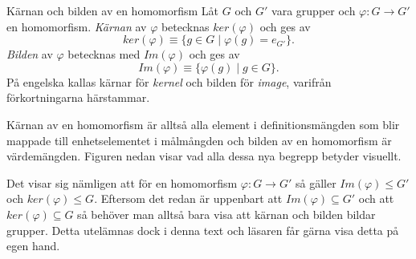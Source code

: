 \documentclass{article}
\theoremstyle{definition}
\begin{document}
\begin{mydef}{Kärnan och bilden av en homomorfism}{}
  Låt $G$ och $G'$ vara grupper och $\varphi : G \rightarrow G'$ en homomorfism.
  \textit{Kärnan} av $\varphi$ betecknas $ker(\varphi)$
  och ges av 
  \[ker(\varphi) \equiv \{g \in G \; | \; \varphi(g) = e_{G'}\}.\]
  \textit{Bilden} av $\varphi$ betecknas med $Im(\varphi)$ och ges av 
  \[Im(\varphi) \equiv \{\varphi(g) \; | \; g \in G\}.\]
  På engelska kallas kärnar för \textit{kernel} och bilden för \textit{image}, varifrån 
  förkortningarna härstammar.
\end{mydef}
Kärnan av en homomorfism är alltså alla element i definitionsmängden som blir mappade 
till enhetselementet i målmångden och bilden av en homomorfism är värdemängden. 
Figuren nedan visar vad alla dessa nya begrepp betyder visuellt.
\begin{center}
\end{center}

Det visar sig nämligen att för en homomorfism $\varphi : G \rightarrow G'$ så gäller
$Im(\varphi) \le G'$ och $ker(\varphi) \le G$. Eftersom det redan är uppenbart att
$Im(\varphi) \subseteq G'$
och att $ker(\varphi) \subseteq G$ så behöver man alltså bara visa att kärnan och bilden bildar 
grupper. Detta utelämnas dock i denna text och läsaren får gärna visa detta på egen hand.
\end{document}
